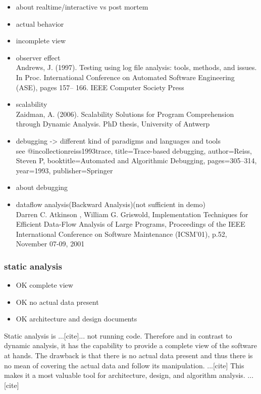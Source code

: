 \begin{itemize}
\item about realtime/interactive vs post mortem
\item actual behavior
\item incomplete view \cite{Ball:1999:CDA:318774.318944}
\item observer effect \\
Andrews, J. (1997). Testing using log file analysis: tools, methods, and issues.
In Proc. International Conference on Automated Software Engineering (ASE), pages 157–
166. IEEE Computer Society Press
\item scalability \\
Zaidman, A. (2006). Scalability Solutions for Program Comprehension through Dynamic
Analysis. PhD thesis, University of Antwerp
\item debugging -> different kind of paradigms and languages and tools\\
see @incollection{reiss1993trace,
title={Trace-based debugging},
author={Reiss, Steven P},
booktitle={Automated and Algorithmic Debugging},
pages={305--314},
year={1993},
publisher={Springer}
}
\item about debugging
\item dataflow analysis(Backward Analysis)(not sufficient in demo) \\
	Darren C. Atkinson , William G. Griswold, Implementation Techniques for Efficient Data-Flow Analysis of Large Programs, Proceedings of the IEEE International Conference on Software Maintenance (ICSM'01), p.52, November 07-09, 2001
\end{itemize}

\subsubsection{static analysis}

\begin{itemize}
\item OK complete view
\item OK no actual data present
\item OK architecture and design documents
\end{itemize}

Static analysis is ...[cite]... not running code.
Therefore and in contrast to dynamic analysis, it has the capability to provide a complete view of the software at hands. The drawback is that there is no actual data present and thus there is no mean of covering the actual data and follow its manipulation. ...[cite]
This makes it a most valuable tool for architecture, design, and algorithm analysis. ...[cite]

